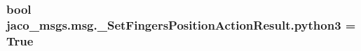 \subsubsection[{\texorpdfstring{python3}{python3}}]{\setlength{\rightskip}{0pt plus 5cm}bool jaco\+\_\+msgs.\+msg.\+\_\+\+Set\+Fingers\+Position\+Action\+Result.\+python3 = True}\hypertarget{namespacejaco__msgs_1_1msg_1_1__SetFingersPositionActionResult_a1e0330e8b986d85361f141e8670e045c}{}\label{namespacejaco__msgs_1_1msg_1_1__SetFingersPositionActionResult_a1e0330e8b986d85361f141e8670e045c}
